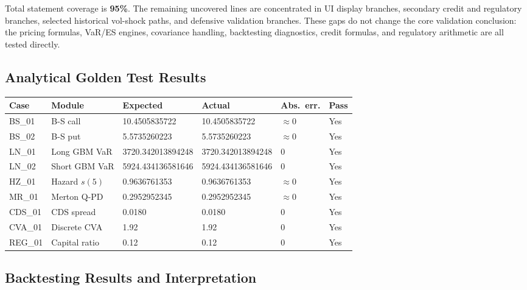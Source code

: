 \documentclass[11pt]{article}
\begin{document}
Total statement coverage is \textbf{95\%}.  The remaining uncovered lines
are concentrated in UI display branches, secondary credit and regulatory
branches, selected historical vol-shock paths, and defensive validation
branches.  These gaps do not change the core validation conclusion: the
pricing formulas, VaR/ES engines, covariance handling, backtesting
diagnostics, credit formulas, and regulatory arithmetic are all tested
directly.

\subsection{Analytical Golden Test Results}

\begin{center}
\footnotesize
\begin{tabular}{L{1.5cm}L{2.2cm}L{3.8cm}L{3.8cm}L{2cm}l}
\toprule
\textbf{Case} & \textbf{Module} & \textbf{Expected} & \textbf{Actual} & \textbf{Abs.\ err.} & \textbf{Pass} \\
\midrule
BS\_01  & B-S call        & 10.4505835722     & 10.4505835722     & $\approx 0$  & Yes \\
BS\_02  & B-S put         & 5.5735260223      & 5.5735260223      & $\approx 0$  & Yes \\
LN\_01  & Long GBM VaR    & 3720.342013894248 & 3720.342013894248 & 0            & Yes \\
LN\_02  & Short GBM VaR   & 5924.434136581646 & 5924.434136581646 & 0            & Yes \\
HZ\_01  & Hazard $s(5)$   & 0.9636761353      & 0.9636761353      & $\approx 0$  & Yes \\
MR\_01  & Merton Q-PD     & 0.2952952345      & 0.2952952345      & $\approx 0$  & Yes \\
CDS\_01 & CDS spread      & 0.0180            & 0.0180            & 0            & Yes \\
CVA\_01 & Discrete CVA    & 1.92              & 1.92              & 0            & Yes \\
REG\_01 & Capital ratio   & 0.12              & 0.12              & 0            & Yes \\
\bottomrule
\end{tabular}
\end{center}

\subsection{Backtesting Results and Interpretation}
\label{sec:backtest-results}
\end{document}
